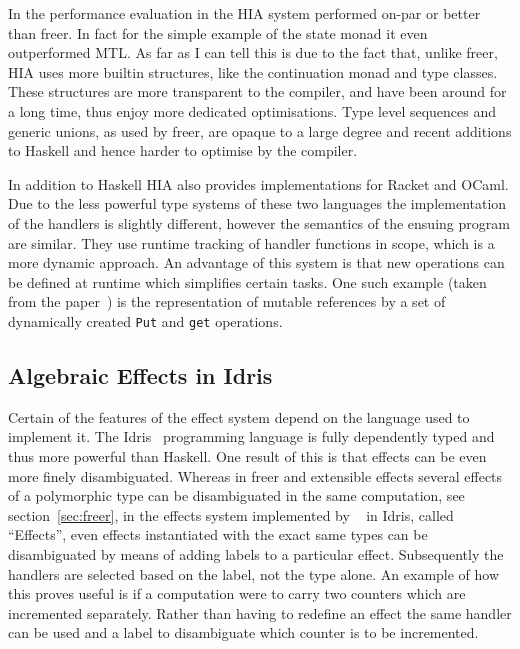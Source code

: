 In the performance evaluation in \cite{freer} the HIA system performed on-par or
better than freer. In fact for the simple example of the state monad it even
outperformed MTL. As far as I can tell this is due to the fact that, unlike
freer, HIA uses more builtin structures, like the continuation monad and type
classes. These structures are more transparent to the compiler, and have been
around for a long time, thus enjoy more dedicated optimisations. Type level
sequences and generic unions, as used by freer, are opaque to a large degree and
recent additions to Haskell and hence harder to optimise by the compiler.

In addition to Haskell HIA also provides implementations for Racket and OCaml.
Due to the less powerful type systems of these two languages the implementation
of the handlers is slightly different, however the semantics of the ensuing
program are similar. They use runtime tracking of handler functions in scope,
which is a more dynamic approach. An advantage of this system is that new
operations can be defined at runtime which simplifies certain tasks. One such
example (taken from the paper~\cite{hia}) is the representation of mutable
references by a set of dynamically created \texttt{Put} and \texttt{get}
operations.

\subsection{Algebraic Effects in Idris}

Certain of the features of the effect system depend on the language used to
implement it. The Idris~\cite{idris}\cite{idris-paper} programming language is
fully dependently typed and thus more powerful than Haskell. One result of this
is that effects can be even more finely disambiguated. Whereas in freer and
extensible effects several effects of a polymorphic type can be disambiguated in
the same computation, see section~\ref{sec:freer}, in the effects system
implemented by
\citeauthor{algebraic-effects-idris}~\cite{algebraic-effects-idris} in Idris,
called ``Effects'', even effects instantiated with the exact same types can be
disambiguated by means of adding labels to a particular effect. Subsequently the handlers
are selected based on the label, not the type alone. An example of how this
proves useful is if a computation were to carry two counters which are
incremented separately. Rather than having to redefine an effect the same
handler can be used and a label to disambiguate which counter is to be
incremented.


